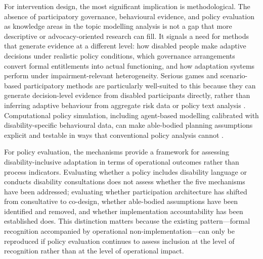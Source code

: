 \documentclass[12pt,a4paper]{article}
\begin{document}
For intervention design, the most significant implication is methodological. The absence of participatory governance, behavioural evidence, and policy evaluation as knowledge areas in the topic modelling analysis is not a gap that more descriptive or advocacy-oriented research can fill. It signals a need for methods that generate evidence at a different level: how disabled people make adaptive decisions under realistic policy conditions, which governance arrangements convert formal entitlements into actual functioning, and how adaptation systems perform under impairment-relevant heterogeneity. Serious games and scenario-based participatory methods are particularly well-suited to this because they can generate decision-level evidence from disabled participants directly, rather than inferring adaptive behaviour from aggregate risk data or policy text analysis \cite{TannenbaumBaruchi2024,gerber2021games}. Computational policy simulation, including agent-based modelling calibrated with disability-specific behavioural data, can make able-bodied planning assumptions explicit and testable in ways that conventional policy analysis cannot \cite{macal2005tutorial}.

For policy evaluation, the mechanisms provide a framework for assessing disability-inclusive adaptation in terms of operational outcomes rather than process indicators. Evaluating whether a policy includes disability language or conducts disability consultations does not assess whether the five mechanisms have been addressed; evaluating whether participation architecture has shifted from consultative to co-design, whether able-bodied assumptions have been identified and removed, and whether implementation accountability has been established does. This distinction matters because the existing pattern---formal recognition accompanied by operational non-implementation---can only be reproduced if policy evaluation continues to assess inclusion at the level of recognition rather than at the level of operational impact.
\end{document}
